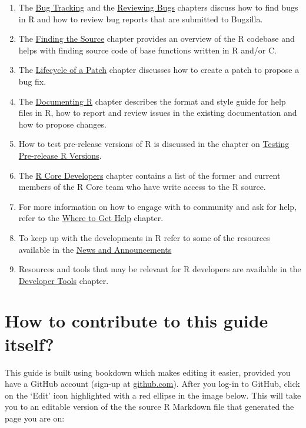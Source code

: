 \documentclass[
]{book}
\begin{document}
\begin{enumerate}
\def\labelenumi{\arabic{enumi}.}
\setcounter{enumi}{1}
\item
  The \protect\hyperlink{BugTrack}{Bug Tracking} and the \protect\hyperlink{ReviewBugs}{Reviewing Bugs} chapters discuss how to find bugs in R and how to review bug reports that are submitted to Bugzilla.
\item
  The \protect\hyperlink{FindSource}{Finding the Source} chapter provides an overview of the R codebase and helps with finding source code of base functions written in R and/or C.
\item
  The \protect\hyperlink{FixBug}{Lifecycle of a Patch} chapter discusses how to create a patch to propose a bug fix.
\item
  The \protect\hyperlink{Doc}{Documenting R} chapter describes the format and style guide for help files in R, how to report and review issues in the existing documentation and how to propose changes.
\item
  How to test pre-release versions of R is discussed in the chapter on \protect\hyperlink{TestRVer}{Testing Pre-release R Versions}.
\item
  The \protect\hyperlink{CoreDev}{R Core Developers} chapter contains a list of the former and current members of the R Core team who have write access to the R source.
\item
  For more information on how to engage with to community and ask for help, refer to the \protect\hyperlink{WhereToGetHelp}{Where to Get Help} chapter.
\item
  To keep up with the developments in R refer to some of the resources available in the \protect\hyperlink{News}{News and Announcements}
\item
  Resources and tools that may be relevant for R developers are available in the \protect\hyperlink{DevTools}{Developer Tools} chapter.
\end{enumerate}

\hypertarget{how-to-contribute-to-this-guide}{%
\section{How to contribute to this guide itself?}\label{how-to-contribute-to-this-guide}}

This guide is built using bookdown which makes editing it easier, provided you have a GitHub account (sign-up at \href{https://github.com/}{github.com}). After you log-in to GitHub, click on the `Edit' icon highlighted with a red ellipse in the image below. This will take you to an editable version of the the source R Markdown file that generated the page you are on:
\end{document}
